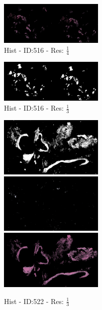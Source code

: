 \documentclass[letterpaper,10pt,oneside]{article}
\begin{document}
\begin{figure}[hbtp]
\begin{subfigure}[b]{5cm}
    \includegraphics[width=5cm]{visualization/results/histogramSeg/res_reduce_4/Region_2_PO13-00516A1_1_7_201305171148.png}
    \caption{Hist - ID:516 - Res: $\frac{1}{4}$}
  \end{subfigure}
  \begin{subfigure}[b]{5cm}
    \includegraphics[width=5cm]{visualization/results/histogramSeg/res_reduce_5/Region_0_PO13-00516A1_1_7_201305171148.png}
    \caption{Hist - ID:516 - Res: $\frac{1}{3}$}
  \end{subfigure}
  \begin{subfigure}[b]{5cm}
    \includegraphics[width=5cm]{visualization/results/histogramSeg/res_reduce_3/Region_0_PO13-00522A1_1_2_201305171639.png}
    \includegraphics[width=5cm]{visualization/results/histogramSeg/res_reduce_3/Region_1_PO13-00522A1_1_2_201305171639.png}
    \includegraphics[width=5cm]{visualization/results/histogramSeg/res_reduce_3/Region_2_PO13-00522A1_1_2_201305171639.png}
    \caption{Hist - ID:522 - Res: $\frac{1}{3}$}
  \end{subfigure}
  \begin{subfigure}[b]{5cm}

\end{subfigure}
\end{figure}
\end{document}
